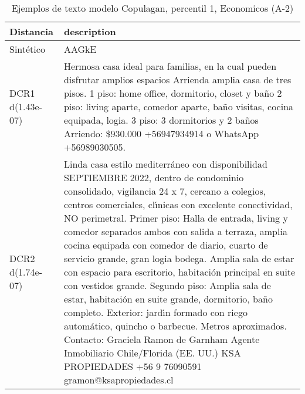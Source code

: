 \begin{table}[H]
\centering
\fontsize{10}{14}\selectfont
\caption{Ejemplos de texto modelo Copulagan, percentil 1, Economicos (A-2)}
\label{table-example-economicos-a-2-copulagan-1p-text}
\begin{tabular}{|l|m{35em}|}
\hline
\rowcolor[gray]{0.8}
Distancia & description \\
\hline Sintético & AAGkE \\
\hline DCR1 d(1.43e-07) & Hermosa casa ideal para familias, en la cual pueden disfrutar amplios espacios Arrienda amplia casa de tres pisos. 1 piso: home office, dormitorio, closet y ba\~no 2 piso: living aparte, comedor aparte, ba\~no visitas, cocina equipada, logia. 3 piso: 3 dormitorios y 2 ba\~nos Arriendo: \$930.000 +56947934914 o WhatsApp +56989030505. \\
\hline DCR2 d(1.74e-07) & Linda casa estilo mediterr\'aneo con disponibilidad SEPTIEMBRE 2022, dentro de condominio consolidado, vigilancia 24 x 7, cercano a colegios, centros comerciales, cl{\'\i}nicas con excelente conectividad, NO perimetral. Primer piso: Halla de entrada, living y comedor separados ambos con salida a terraza, amplia cocina equipada con comedor de diario, cuarto de servicio grande, gran logia bodega. Amplia sala de estar con espacio para escritorio, habitaci\'on principal en suite con vestidos grande. Segundo piso: Amplia sala de estar, habitaci\'on en suite grande, dormitorio, ba\~no completo. Exterior: jard{\'\i}n formado con riego autom\'atico, quincho o barbecue. Metros aproximados.  Contacto: Graciela Ramon de Garnham Agente Inmobiliario Chile/Florida (EE. UU.) KSA PROPIEDADES +56 9 76090591 gramon@ksapropiedades.cl \\
\hline
\end{tabular}
\end{table}
